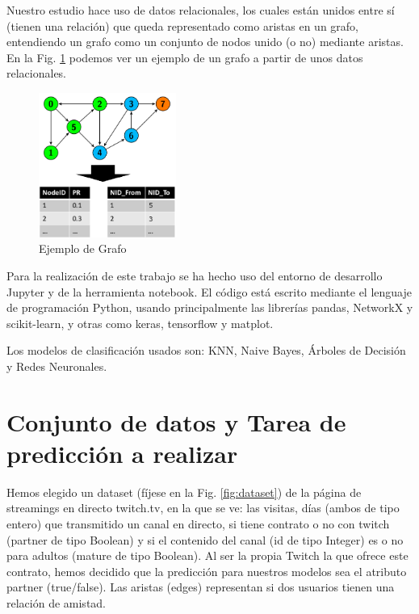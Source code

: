 \documentclass[conference,a4paper]{IEEEtran}
\begin{document}
Nuestro estudio hace uso de datos relacionales, los cuales están unidos entre sí (tienen una relación) que queda representado como aristas en un grafo, entendiendo un grafo como un conjunto de nodos unido (o no) mediante aristas. En la Fig. \ref{fig:tablaEj} podemos ver un ejemplo de un grafo a partir de unos datos relacionales. 

\begin{figure} %
    \centering
    \includegraphics[width=0.4\textwidth]{./ImagenesMemoria/TablaEjemplo}
    \caption{\label{fig:tablaEj}Ejemplo de Grafo}
\end{figure}


Para la realización de este trabajo se ha hecho uso del entorno de desarrollo Jupyter y de la herramienta notebook. El código está escrito mediante el lenguaje de programación Python, usando principalmente las librerías pandas, NetworkX y scikit-learn, y otras como keras, tensorflow y matplot.



Los modelos de clasificación usados son: KNN, Naive Bayes, Árboles de Decisión y Redes Neuronales.

\section{Conjunto de datos y Tarea de predicción a realizar}
Hemos elegido un dataset (fíjese en la Fig. \ref{fig:dataset}) de la página de streamings en directo twitch.tv, en la que se ve: las visitas, días (ambos de tipo entero) que transmitido un canal en directo, si tiene contrato o no con twitch (partner de tipo Boolean) y si el contenido del canal (id de tipo Integer) es o no para adultos (mature de tipo Boolean). Al ser la propia Twitch la que ofrece este contrato, hemos decidido que la predicción para nuestros modelos sea el atributo partner (true/false). Las aristas (edges) representan si dos usuarios tienen una relación de amistad.
\end{document}
